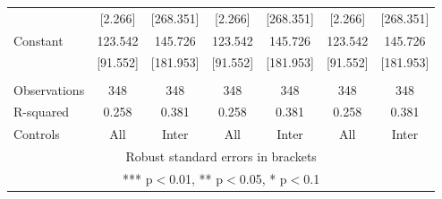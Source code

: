 \begin{tabular}{lcccccc}
 & [2.266] & [268.351] & [2.266] & [268.351] & [2.266] & [268.351] \\
Constant & 123.542 & 145.726 & 123.542 & 145.726 & 123.542 & 145.726 \\
 & [91.552] & [181.953] & [91.552] & [181.953] & [91.552] & [181.953] \\
 &  &  &  &  &  &  \\
Observations & 348 & 348 & 348 & 348 & 348 & 348 \\
R-squared & 0.258 & 0.381 & 0.258 & 0.381 & 0.258 & 0.381 \\
 Controls & All & Inter & All & Inter & All & Inter \\ \hline
\multicolumn{7}{c}{ Robust standard errors in brackets} \\
\multicolumn{7}{c}{ *** p$<$0.01, ** p$<$0.05, * p$<$0.1} \\
\end{tabular}
